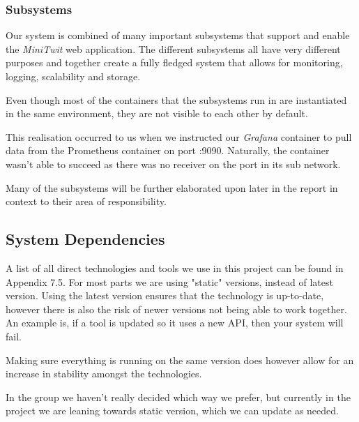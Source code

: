 \subsubsection{Subsystems}
Our system is combined of many important subsystems that support and enable the \textit{MiniTwit} web application. The different subsystems all have very different purposes and together create a fully fledged system that allows for monitoring, logging, scalability and storage.

Even though most of the containers that the subsystems run in are instantiated in the same environment, they are not visible to each other by default. 

This realisation occurred to us when we instructed our \textit{Grafana} container to pull data from the Prometheus container on port :9090. Naturally, the container wasn't able to succeed as there was no receiver on the port in its sub network.

Many of the subsystems will be further elaborated upon later in the report in context to their area of responsibility.






\subsection{System Dependencies}
A list of all direct technologies and tools we use in this project can be found in Appendix 7.5. For most parts we are using "static" versions, instead of latest version. Using the latest version ensures that the technology is up-to-date, however there is also the risk of newer versions not being able to work together. An example is, if a tool is updated so it uses a new API, then your system will fail. 

Making sure everything is running on the same version does however allow for an increase in stability amongst the technologies.

In the group we haven't really decided which way we prefer, but currently in the project we are leaning towards static version, which we can update as needed. 

